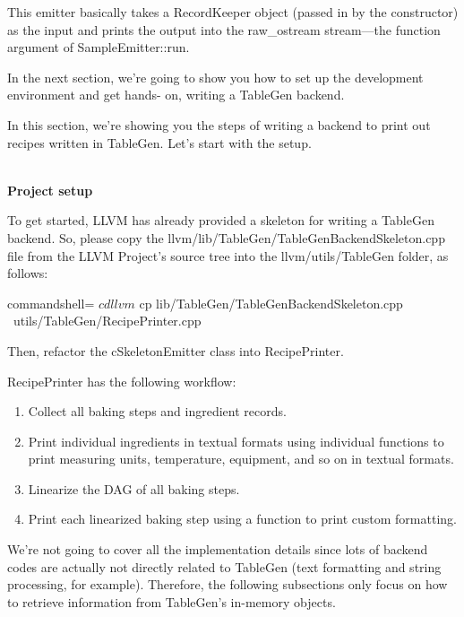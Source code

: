 This emitter basically takes a RecordKeeper object (passed in by the constructor) as the input and prints the output into the raw\_ostream stream—the function argument of SampleEmitter::run.

In the next section, we're going to show you how to set up the development environment and get hands- on, writing a TableGen backend.


In this section, we're showing you the steps of writing a backend to print out recipes written in TableGen. Let's start with the setup.

\hspace*{\fill} \\ %
\noindent
\textbf{Project setup}

To get started, LLVM has already provided a skeleton for writing a TableGen backend. So, please copy the llvm/lib/TableGen/TableGenBackendSkeleton.cpp file from the LLVM Project's source tree into the llvm/utils/TableGen folder, as follows:

\begin{tcblisting}{commandshell={}}
$ cd llvm
$ cp lib/TableGen/TableGenBackendSkeleton.cpp \
      utils/TableGen/RecipePrinter.cpp
\end{tcblisting}

Then, refactor the cSkeletonEmitter class into RecipePrinter.

RecipePrinter has the following workflow:

\begin{enumerate}
\item Collect all baking steps and ingredient records.
\item Print individual ingredients in textual formats using individual functions to print measuring units, temperature, equipment, and so on in textual formats.
\item Linearize the DAG of all baking steps.
\item Print each linearized baking step using a function to print custom formatting.
\end{enumerate}

We're not going to cover all the implementation details since lots of backend codes are actually not directly related to TableGen (text formatting and string processing, for example). Therefore, the following subsections only focus on how to retrieve information from TableGen's in-memory objects.

